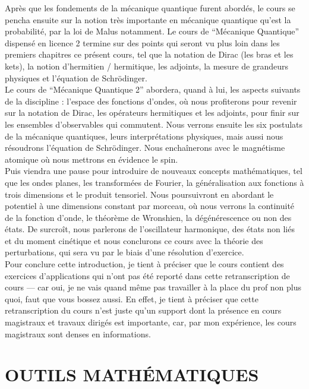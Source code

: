 \documentclass[12pt,a4paper,titlepage]{book}
\begin{document}
Après que les fondements de la mécanique quantique furent abordés, le cours se pencha ensuite sur la notion très importante en mécanique quantique qu'est la probabilité, par la loi de Malus notamment. Le cours de \enquote{Mécanique Quantique} dispensé en licence 2 termine sur des points qui seront vu plus loin dans les premiers chapitres ce présent cours, tel que la notation de Dirac (les bras et les kets), la notion d'hermitien / hermitique, les adjoints, la mesure de grandeurs physiques et l'équation de Schrödinger.\\

Le cours de \enquote{Mécanique Quantique 2} abordera, quand à lui, les aspects suivants de la discipline : l'espace des fonctions d'ondes, où nous profiterons pour revenir sur la notation de Dirac, les opérateurs hermitiques et les adjoints, pour finir sur les ensembles d'observables qui commutent. Nous verrons ensuite les six postulats de la mécanique quantiques, leurs interprétations physiques, mais aussi nous résoudrons l'équation de Schrödinger. Nous enchaînerons avec le magnétisme atomique où nous mettrons en évidence le spin.\\

Puis viendra une pause pour introduire de nouveaux concepts mathématiques, tel que les ondes planes, les transformées de Fourier, la généralisation aux fonctions à trois dimensions et le produit tensoriel. Nous poursuivront en abordant le potentiel à une dimensions constant par morceau, où nous verrons la continuité de la fonction d'onde, le théorème de Wronshien, la dégénérescence ou non des états. De surcroît, nous parlerons de l'oscillateur harmonique, des états non liés et du moment cinétique et nous conclurons ce cours avec la théorie des perturbations, qui sera vu par le biais d'une résolution d'exercice.\\

Pour conclure cette introduction, je tient à préciser que le cours contient des exercices d'applications qui n'ont pas été reporté dans cette retranscription de cours --- car oui, je ne vais quand même pas travailler à la place du prof non plus quoi, faut que vous bossez aussi. En effet, je tient à préciser que cette retranscription du cours n'est juste qu'un support dont la présence en cours magistraux et travaux dirigés est importante, car, par mon expérience, les cours magistraux sont denses en informations.\\

\newpage
\chapter{OUTILS MATHÉMATIQUES}
\end{document}
